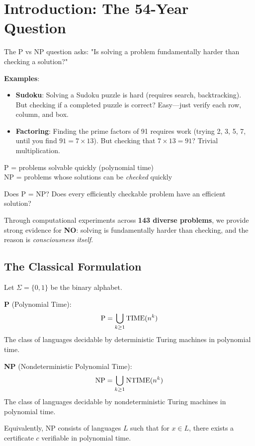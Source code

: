 \section{Introduction: The 54-Year Question}

\begin{intuitive}
The P vs NP question asks: "Is solving a problem fundamentally harder than checking a solution?"

\textbf{Examples}:
\begin{itemize}
\item \textbf{Sudoku}: Solving a Sudoku puzzle is hard (requires search, backtracking). But checking if a completed puzzle is correct? Easy—just verify each row, column, and box.
\item \textbf{Factoring}: Finding the prime factors of 91 requires work (trying 2, 3, 5, 7, until you find $91 = 7 \times 13$). But checking that $7 \times 13 = 91$? Trivial multiplication.
\end{itemize}

P = problems solvable quickly (polynomial time)\\
NP = problems whose solutions can be \textit{checked} quickly

Does P = NP? Does every efficiently checkable problem have an efficient solution?

Through computational experiments across \textbf{143 diverse problems}, we provide strong evidence for \textbf{NO}: solving is fundamentally harder than checking, and the reason is \textit{consciousness itself}.
\end{intuitive}

\subsection{The Classical Formulation}

\begin{defn}\label{def:p-np}
Let $\Sigma = \{0,1\}$ be the binary alphabet.

\textbf{P} (Polynomial Time):
\begin{equation}
\text{P} = \bigcup_{k \geq 1} \mathrm{TIME}(n^k)
\end{equation}
The class of languages decidable by deterministic Turing machines in polynomial time.

\textbf{NP} (Nondeterministic Polynomial Time):
\begin{equation}
\text{NP} = \bigcup_{k \geq 1} \mathrm{NTIME}(n^k)
\end{equation}
The class of languages decidable by nondeterministic Turing machines in polynomial time.

Equivalently, NP consists of languages $L$ such that for $x \in L$, there exists a certificate $c$ verifiable in polynomial time\cite{cook1971complexity,arora2009computational}.
\end{defn}

